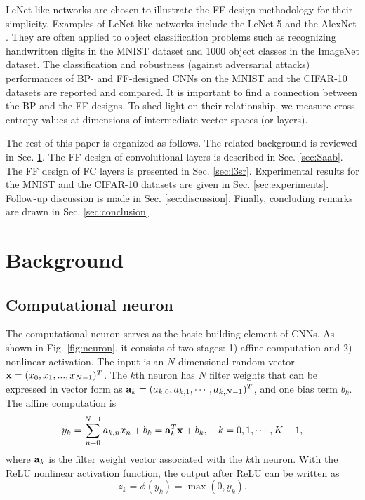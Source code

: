\documentclass[preprint,12pt]{elsarticle}
\begin{document}
LeNet-like networks are chosen to illustrate the FF design methodology
for their simplicity. Examples of LeNet-like networks include the
LeNet-5 \cite{LeNet1998} and the AlexNet \cite{NIPS2012_AlexNet}. They
are often applied to object classification problems such as recognizing
handwritten digits in the MNIST dataset and 1000 object classes in the
ImageNet dataset.  The classification and robustness (against
adversarial attacks) performances of BP- and FF-designed CNNs on the
MNIST and the CIFAR-10 datasets are reported and compared.  It is
important to find a connection between the BP and the FF designs.  To
shed light on their relationship, we measure cross-entropy values at
dimensions of intermediate vector spaces (or layers). 

The rest of this paper is organized as follows. The related background
is reviewed in Sec.  \ref{sec:interpretation}. The FF design of
convolutional layers is described in Sec. \ref{sec:Saab}.  The FF design
of FC layers is presented in Sec.  \ref{sec:l3sr}.  Experimental results
for the MNIST and the CIFAR-10 datasets are given in Sec.
\ref{sec:experiments}.  Follow-up discussion is made in Sec.
\ref{sec:discussion}.  Finally, concluding remarks are drawn in Sec.
\ref{sec:conclusion}. 

\section{Background}\label{sec:interpretation}

\subsection{Computational neuron}

The computational neuron serves as the basic building element of CNNs.
As shown in Fig. \ref{fig:neuron}, it consists of two stages: 1) affine
computation and 2) nonlinear activation.  The input is an
$N$-dimensional random vector ${\bf x}=(x_0, x_1, ... , x_{N-1})^T$. The
$k$th neuron has $N$ filter weights that can be expressed in vector form
as ${\bf a}_k=(a_{k,0}, a_{k,1}, \cdots , a_{k,N-1})^T$, and one bias
term $b_k$.  The affine computation is
\begin{equation}\label{eq:affine}
y_k = \sum_{n=0}^{N-1} a_{k,n} x_n + b_k = {\bf a}_k^T {\bf x} + b_k, 
\quad k=0, 1, \cdots, K-1,
\end{equation}
where ${\bf a}_k$ is the filter weight vector associated with the $k$th
neuron. With the ReLU nonlinear activation function, the output after
ReLU can be written as
\begin{equation}\label{eq:na}
z_k= \phi (y_k) = \max (0, y_k).
\end{equation}
\end{document}

